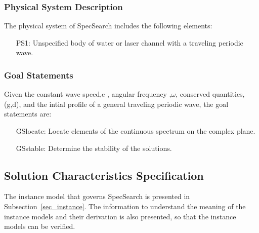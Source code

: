 \documentclass[12pt]{article}
\begin{document}
\subsubsection{Physical System Description}

The physical system of SpecSearch includes the following elements:

\begin{itemize}

\item[PS1:] 
Unspecified body of water or laser channel with a traveling periodic 
wave.

\end{itemize}

\subsubsection{Goal Statements}

\noindent Given the constant wave speed,c , angular frequency ,$\omega$, 
conserved quantities, (g,d), and the intial  profile of a general traveling 
periodic wave, the goal statements are: 

\begin{itemize}[leftmargin=.75in]

\item[GSlocate:] {Locate elements of the continuous spectrum on the 
complex plane. }

\item[GSstable:] {Determine the stability of the solutions.}

\end{itemize}


\subsection{Solution Characteristics Specification}

The instance model that governs SpecSearch is presented in
Subsection~\ref{sec_instance}.  The information to understand the meaning of the
instance models and their derivation is also presented, so that the instance
models can be verified.
\end{document}
